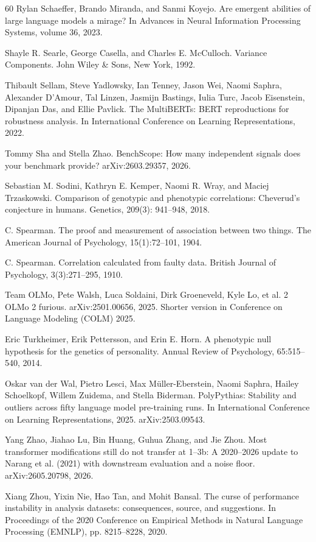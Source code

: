 \begin{thebibliography}{60}
Rylan Schaeffer, Brando Miranda, and Sanmi Koyejo. Are emergent abilities of large language models a mirage? In Advances in Neural Information Processing Systems, volume 36, 2023.

Shayle R. Searle, George Casella, and Charles E. McCulloch. Variance Components. John Wiley \& Sons, New York, 1992.

Thibault Sellam, Steve Yadlowsky, Ian Tenney, Jason Wei, Naomi Saphra, Alexander D'Amour, Tal Linzen, Jasmijn Bastings, Iulia Turc, Jacob Eisenstein, Dipanjan Das, and Ellie Pavlick. The MultiBERTs: BERT reproductions for robustness analysis. In International Conference on Learning Representations, 2022.

Tommy Sha and Stella Zhao. BenchScope: How many independent signals does your benchmark provide? arXiv:2603.29357, 2026.

Sebastian M. Sodini, Kathryn E. Kemper, Naomi R. Wray, and Maciej Trzaskowski. Comparison of genotypic and phenotypic correlations: Cheverud's conjecture in humans. Genetics, 209(3): 941--948, 2018.

C. Spearman. The proof and measurement of association between two things. The American Journal of Psychology, 15(1):72--101, 1904.

C. Spearman. Correlation calculated from faulty data. British Journal of Psychology, 3(3):271--295, 1910.

Team OLMo, Pete Walsh, Luca Soldaini, Dirk Groeneveld, Kyle Lo, et al. 2 OLMo 2 furious. arXiv:2501.00656, 2025. Shorter version in Conference on Language Modeling (COLM) 2025.

Eric Turkheimer, Erik Pettersson, and Erin E. Horn. A phenotypic null hypothesis for the genetics of personality. Annual Review of Psychology, 65:515--540, 2014.

Oskar van der Wal, Pietro Lesci, Max M\"{u}ller-Eberstein, Naomi Saphra, Hailey Schoelkopf, Willem Zuidema, and Stella Biderman. PolyPythias: Stability and outliers across fifty language model pre-training runs. In International Conference on Learning Representations, 2025. arXiv:2503.09543.

Yang Zhao, Jiahao Lu, Bin Huang, Guhua Zhang, and Jie Zhou. Most transformer modifications still do not transfer at 1--3b: A 2020--2026 update to Narang et al. (2021) with downstream evaluation and a noise floor. arXiv:2605.20798, 2026.

Xiang Zhou, Yixin Nie, Hao Tan, and Mohit Bansal. The curse of performance instability in analysis datasets: consequences, source, and suggestions. In Proceedings of the 2020 Conference on Empirical Methods in Natural Language Processing (EMNLP), pp. 8215--8228, 2020.

\end{thebibliography}
